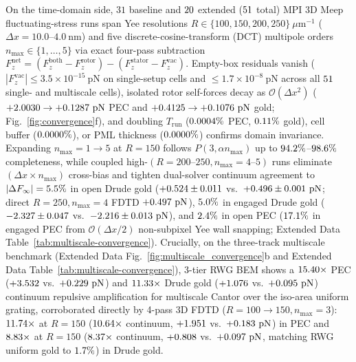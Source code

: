 \documentclass[pdflatex,sn-nature]{sn-jnl}
\begin{document}
On the time-domain side, $31$ baseline and $20{}$ extended ($51{}$ total) MPI 3D Meep\cite{oskooi2010} fluctuating-stress runs\cite{rodriguez2009pra} span Yee resolutions $R \in \{100, 150, 200, 250\}\ \mu\mathrm{m}^{-1}$ ($\Delta x = 10.0\text{--}4.0\ \mathrm{nm}$) and five discrete-cosine-transform (DCT) multipole orders $n_{\max} \in \{1,\dots,5\}$ via exact four-pass subtraction $F_z^{\mathrm{net}} = (F_z^{\mathrm{both}} - F_z^{\mathrm{rotor}}) - (F_z^{\mathrm{stator}} - F_z^{\mathrm{vac}})$. Empty-box residuals vanish ($|F_z^{\mathrm{vac}}| \le 3.5 \times 10^{-15}\ \mathrm{pN}$ on single-setup cells and $\le 1.7 \times 10^{-8}\ \mathrm{pN}$ across all $51{}$ single- and multiscale cells), isolated rotor self-forces decay as $\mathcal{O}(\Delta x^2)$ ($+2.0030{} \to +0.1287{}\ \mathrm{pN}$ PEC and $+0.4125{} \to +0.1076{}\ \mathrm{pN}$ gold; Fig.~\ref{fig:convergence}f), and doubling $T_{\mathrm{run}}$ ($0.0004{}\%$ PEC, $0.11{}\%$ gold), cell buffer ($0.0000{}\%$), or PML thickness ($0.0000{}\%$) confirms domain invariance. Expanding $n_{\max} = 1\to 5$ at $R=150$ follows $P(3,\alpha n_{\max})$ up to $94.2{}\%$--$98.6{}\%$ completeness, while coupled high-$(R=200\text{--}250, n_{\max}=4\text{--}5)$ runs eliminate $(\Delta x \times n_{\max})$ cross-bias and tighten dual-solver continuum agreement to $|\Delta F_\infty| = 5.5{}\%$ in open Drude gold ($+0.524{} \pm 0.011{}$ vs.\ $+0.496{} \pm 0.001{}\ \mathrm{pN}$; direct $R=250, n_{\max}=4$ FDTD $+0.497{}\ \mathrm{pN}$), $5.0{}\%$ in engaged Drude gold ($-2.327{} \pm 0.047{}$ vs.\ $-2.216{} \pm 0.013{}\ \mathrm{pN}$), and $2.4{}\%$ in open PEC ($17.1{}\%$ in engaged PEC from $\mathcal{O}(\Delta x/2)$ non-subpixel Yee wall snapping; Extended Data Table~\ref{tab:multiscale-convergence}). Crucially, on the three-track multiscale benchmark (Extended Data Fig.~\ref{fig:multiscale_convergence}b and Extended Data Table~\ref{tab:multiscale-convergence}), 3-tier RWG BEM shows a $15.40{}\times$ PEC ($+3.532{}$ vs.\ $+0.229{}\ \mathrm{pN}$) and $11.33{}\times$ Drude gold ($+1.076{}$ vs.\ $+0.095{}\ \mathrm{pN}$) continuum repulsive amplification for multiscale Cantor over the iso-area uniform grating, corroborated directly by 4-pass 3D FDTD ($R=100\to 150, n_{\max}=3$): $11.74{}\times$ at $R=150$ ($10.64{}\times$ continuum, $+1.951{}$ vs.\ $+0.183{}\ \mathrm{pN}$) in PEC and $8.83{}\times$ at $R=150$ ($8.37{}\times$ continuum, $+0.808{}$ vs.\ $+0.097{}\ \mathrm{pN}$, matching RWG uniform gold to $1.7{}\%$) in Drude gold.
\end{document}
